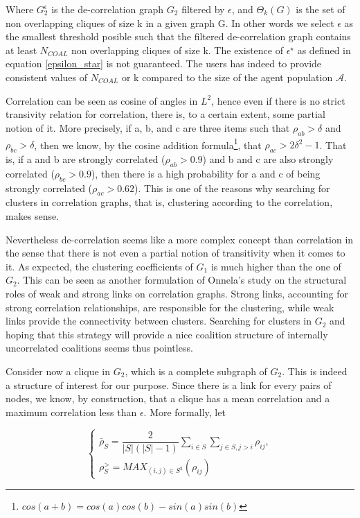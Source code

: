 \documentclass[conference]{IEEEtran}
\begin{document}
Where $ G_{2}^{\epsilon} $ is the de-correlation graph $ G_{2} $ filtered by $ \epsilon $, and $ \Theta_{k}(G) $ is the set of non overlapping cliques of size k in a given graph G. In other words we select $ \epsilon $ as the smallest threshold posible such that the filtered de-correlation graph contains at least $ N_{COAL} $ non overlapping cliques of size k. The existence of $ \epsilon^{\star} $  as defined in equation  \ref{epsilon_star} is not guaranteed. The users has indeed to provide consistent values of $ N_{COAL} $ or k compared to the size of the agent population $ \mathcal{A} $. 

Correlation can be seen as cosine of angles in $ L^{2} $, hence even if there is no strict transivity relation for correlation, there is, to a certain extent, some partial notion of it. More precisely, if a, b, and c are three items such that $ \rho_{ab} > \delta $ and $ \rho_{bc} > \delta $, then we know, by the cosine addition formula\footnote{ $ cos(a+b) = cos(a)cos(b) - sin(a)sin(b) $ }, that $ \rho_{ac} > 2 \delta^{2} - 1 $. That is, if a and b are strongly correlated ($\rho_{ab} > 0.9 $) and b and c are also strongly correlated ($\rho_{bc} > 0.9 $), then there is a high probability for a and c of being strongly correlated ($\rho_{ac} > 0.62 $). This is one of the reasons why searching for clusters in correlation graphs, that is, clustering according to the correlation, makes sense.

Nevertheless de-correlation seems like a more complex concept than correlation in the sense that there is not even a partial notion of transitivity when it comes to it. As expected, the clustering coefficients of $ G_{1} $ is much higher than the one of $ G_{2} $. This can be seen as another formulation of Onnela's study on the structural roles of weak and strong links on correlation graphs. Strong links, accounting for strong correlation relationships, are responsible for the clustering, while weak links provide the connectivity between clusters. Searching for clusters in $ G_{2} $ and hoping that this strategy will provide a nice coalition structure of internally uncorrelated coalitions seems thus pointless.

Consider now a clique in  $ G_{2} $, which is a complete subgraph of $ G_{2} $. This is indeed a structure of interest for our purpose. Since there is a link for every pairs of nodes, we know, by construction, that a clique has a mean correlation and a maximum correlation less than $ \epsilon $. More formally, let 

\begin{equation}
\left\{ \begin{array}{lll}
			\bar{\rho}_{S} = \dfrac{2}{|S|(|S|-1)} \sum_{i \in S} \sum_{j \in S, j>i} \rho_{ij}, \\ 
			\rho_{S}^{>} = MAX_{(i,j) \in S^{2}}(\rho_{ij})
\end{array} \right.			
\end{equation}
\end{document}
